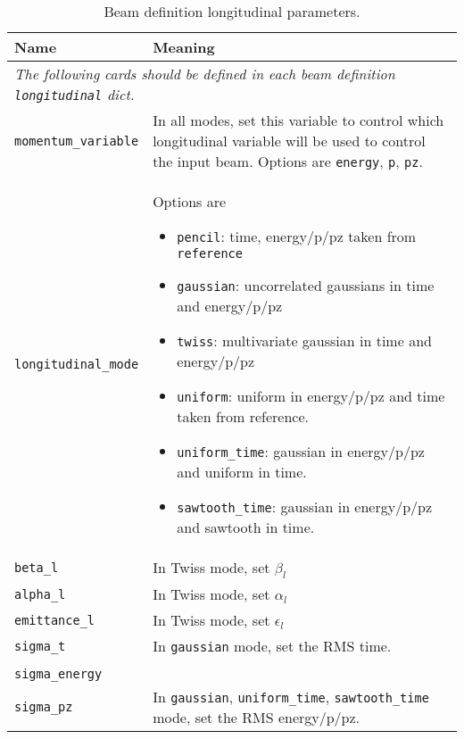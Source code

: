\begin{table*}
\begin{center}
\caption{Beam definition longitudinal parameters.}
\begin{tabularx}{\linewidth}{lX}
Name & Meaning \\
\hline
\multicolumn{2}{l}{\emph{The following cards should be defined in each beam definition \verb|longitudinal| dict.}} \\
\hline
\verb|momentum_variable| & In all modes, set this variable to control which longitudinal variable will be used to control the input beam. Options are \verb|energy|, \verb|p|, \verb|pz|. \\
\verb|longitudinal_mode| & Options are
                          \begin{itemize}
                            \setlength{\itemsep}{0mm}
                            \item \verb|pencil|: time, energy/p/pz taken from \verb|reference|
                            \item \verb|gaussian|: uncorrelated gaussians in time and energy/p/pz
                            \item \verb|twiss|: multivariate gaussian in time and energy/p/pz
                            \item \verb|uniform|: uniform in energy/p/pz and time taken from reference.
                            \item \verb|uniform_time|: gaussian in energy/p/pz and uniform in time.
                            \item \verb|sawtooth_time|: gaussian in energy/p/pz and sawtooth in time.
                          \end{itemize} \\
\hline
\verb|beta_l| & In Twiss mode, set $\beta_l$\\
\verb|alpha_l| & In Twiss mode, set $\alpha_l$\\
\verb|emittance_l| & In Twiss mode, set $\epsilon_l$\\
\hline
\verb|sigma_t| & In \verb|gaussian| mode, set the RMS time. \\
\hline
\begin{tabular}{l} \verb|sigma_p| \\ \verb|sigma_energy| \\ \verb|sigma_pz| \end{tabular} & In \verb|gaussian|, \verb|uniform_time|, \verb|sawtooth_time| mode, set the RMS energy/p/pz. \\

\end{tabularx}
\end{center}
\end{table*}
